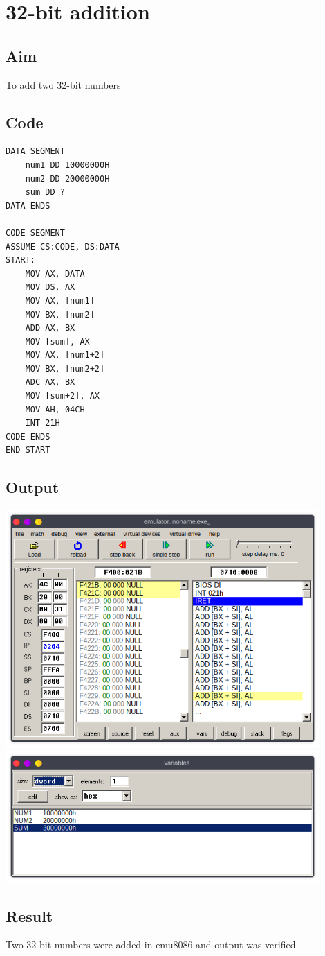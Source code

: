 \section{32-bit addition}
\subsection{Aim}
To add two 32-bit numbers

\subsection{Code}
\begin{lstlisting}
DATA SEGMENT
	num1 DD 10000000H
	num2 DD 20000000H
	sum DD ?
DATA ENDS

CODE SEGMENT
ASSUME CS:CODE, DS:DATA
START:
	MOV AX, DATA
	MOV DS, AX
	MOV AX, [num1]
	MOV BX, [num2]
	ADD AX, BX
	MOV [sum], AX
	MOV AX, [num1+2]
	MOV BX, [num2+2]
	ADC AX, BX
	MOV [sum+2], AX
    MOV AH, 04CH
    INT 21H
CODE ENDS
END START
\end{lstlisting}

\subsection{Output}
\begin{center}
	\includegraphics[width=0.90\textwidth]{img/p3/ss1.png}
	\includegraphics[width=0.90\textwidth]{img/p3/ss2.png}
\end{center}

\subsection{Result}
Two 32 bit numbers were added in emu8086 and output was verified